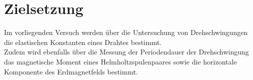 \section{Zielsetzung}
\label{sec:Zielsetzung}
Im vorliegenden Versuch werden über die Untersuchung von Drehschwingungen die elastischen Konstanten eines Drahtes bestimmt.\\
Zudem wird ebenfalls über die Messung der Periodendauer der Drehschwingung das magnetische Moment eines Helmholtzspulenpaares sowie die horizontale Komponente des Erdmagnetfelds bestimmt.
